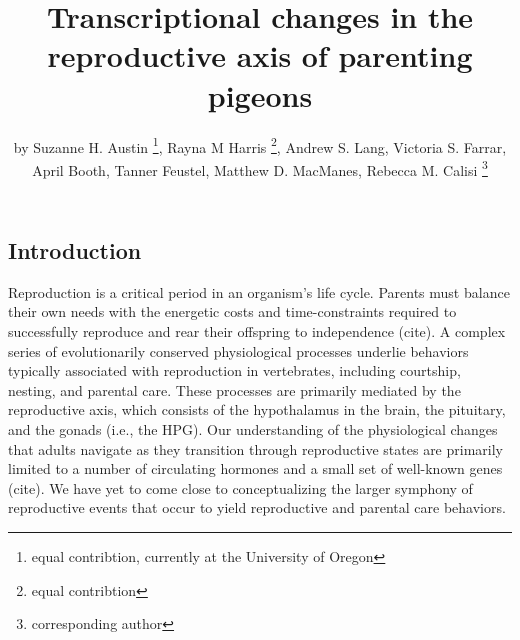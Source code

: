 \title{Transcriptional changes in the reproductive axis of parenting pigeons}
\author{by Suzanne H. Austin \footnote{equal contribtion, currently at the
  University of Oregon}, Rayna M Harris \footnote{equal contribtion}, Andrew S. Lang, Victoria S. Farrar, April Booth, Tanner Feustel, Matthew D. MacManes, Rebecca M. Calisi \footnote{corresponding author}}

\maketitle


\hypertarget{introduction}{%
\subsection{Introduction}\label{introduction}}

Reproduction is a critical period in an organism's life cycle. Parents
must balance their own needs with the energetic costs and
time-constraints required to successfully reproduce and rear their
offspring to independence (cite). A complex series of evolutionarily
conserved physiological processes underlie behaviors typically
associated with reproduction in vertebrates, including courtship,
nesting, and parental care. These processes are primarily mediated by
the reproductive axis, which consists of the hypothalamus in the brain,
the pituitary, and the gonads (i.e., the HPG). Our understanding of the
physiological changes that adults navigate as they transition through
reproductive states are primarily limited to a number of circulating
hormones and a small set of well-known genes (cite). We have yet to come
close to conceptualizing the larger symphony of reproductive events that
occur to yield reproductive and parental care behaviors.

